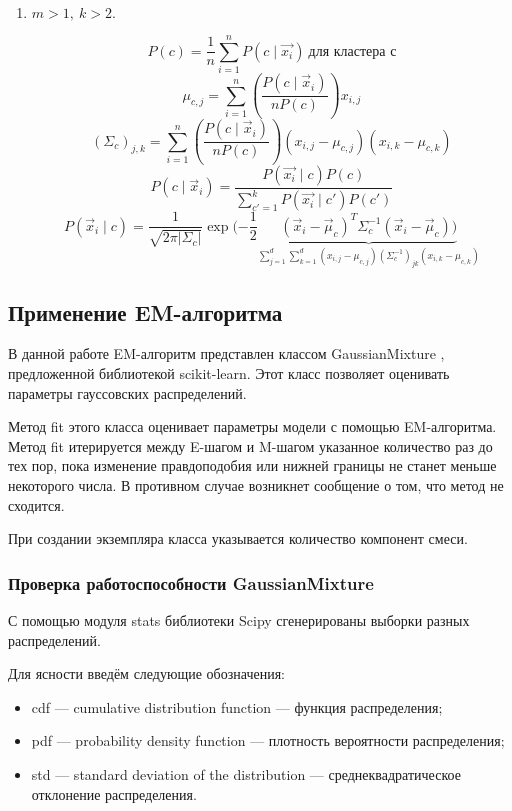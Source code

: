 \begin{enumerate}
    \item

    $m > 1, \ k > 2.$

    $$P(c) = \frac{1}{n} \sum_{i=1}^n P(c \mid  \vec{x_i}) \ \text{для кластера с}$$
    $$\mu_{c, j}=\sum_{i=1}^{n}\left(\frac{P\left(c \mid \vec{x}_{i}\right)}{n P(c)}\right) x_{i, j}$$
    $$\left(\Sigma_{c}\right)_{j, k}=\sum_{i=1}^{n}\left(\frac{P\left(c \mid \vec{x}_{i}\right)}{n P(c)}\right)\left(x_{i, j}-\mu_{c, j}\right)\left(x_{i, k}-\mu_{c, k}\right)$$
    $$P(c \mid \vec{x}_i) = \frac{P(\vec{x_i} \mid c)P(c)}{\sum_{c'=1}^k P(\vec{x_i} \mid c')P(c')}$$
    $$P\left(\vec{x}_{i} \mid c\right)=\frac{1}{\sqrt{2 \pi\left|\Sigma_{c}\right|}} \exp (-\frac{1}{2} \underbrace{\left(\vec{x}_{i}-\vec{\mu}_{c}\right)^{T}\Sigma_{c}^{-1}\left(\vec{x}_{i}-\vec{\mu}_{c}\right))}_{\sum_{j=1}^{d} \sum_{k=1}^{d}\left(x_{i, j}-\mu_{c, j}\right)\left(\Sigma_{c}^{-1}\right)_{j k}\left(x_{i, k}-\mu_{c, k}\right)}$$
    \end{enumerate}



\subsection{Применение EM-алгоритма}

В данной работе EM-алгоритм представлен классом GaussianMixture \cite{fifth}, предложенной библиотекой scikit-learn. Этот класс позволяет оценивать параметры гауссовских распределений.

Метод fit этого класса оценивает параметры модели с помощью EM-алгоритма. Метод fit итерируется между E-шагом и M-шагом указанное количество раз до тех пор, пока изменение правдоподобия или нижней границы не станет меньше некоторого числа. В противном случае возникнет сообщение о том, что метод не сходится.

При создании экземпляра класса указывается количество компонент смеси.

\subsubsection{Проверка работоспособности GaussianMixture}

С помощью модуля stats \cite{sixth} библиотеки Scipy сгенерированы выборки разных распределений.

Для ясности введём следующие обозначения:
\begin{itemize}
    \item cdf --- cumulative distribution function --- функция распределения;
    \item pdf --- probability density function --- плотность вероятности распределения;
    \item std --- standard deviation of the distribution --- среднеквадратическое отклонение распределения.
\end{itemize}

